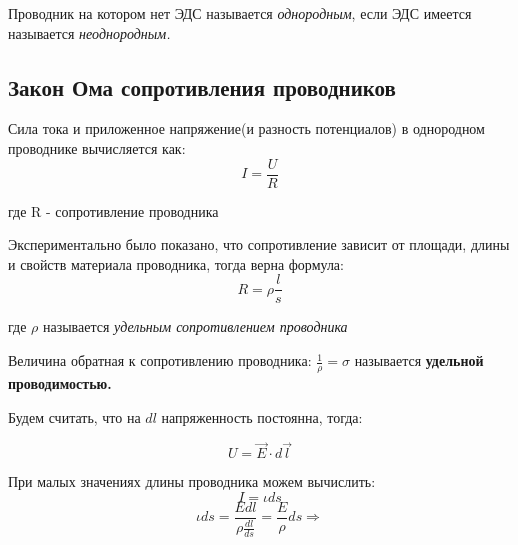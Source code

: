 \documentclass[../main.tex]{subfiles}
\begin{document}
\vspace{5px}

 Проводник на котором нет ЭДС называется \textit{однородным}, если ЭДС имеется называется \textit{неоднородным.}

\subsection{Закон Ома сопротивления проводников}

Сила тока и приложенное напряжение(и разность потенциалов) в однородном проводнике вычисляется как:
\[I = \frac{U}{R}\]
\begin{center}
    где R - сопротивление проводника
\end{center}


Экспериментально было показано, что сопротивление зависит от площади, длины и свойств материала проводника, тогда верна формула:
\[R = \rho \frac{l}{s}\]
\begin{center}
    где $\rho$  называется \textit{удельным сопротивлением проводника}
\end{center}
 Величина обратная к сопротивлению проводника: $\frac{1}{\rho} = \sigma$ называется \textbf{удельной проводимостью.}

\begin{center}


\end{center}

Будем считать, что на $dl$ напряженность постоянна, тогда:

\[U = \vec E \cdot d \vec l\]

При малых значениях длины проводника можем вычислить:
\[I = \iota ds \]
\[ \iota ds = \frac{E dl}{\rho \frac{dl}{ds}} =  \frac{E}{\rho} ds \Rightarrow\]
\end{document}
